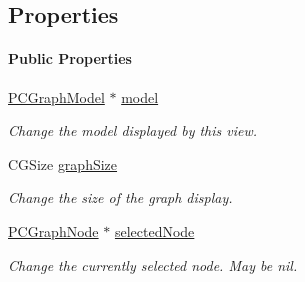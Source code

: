 \subsection*{Properties}
\begin{Indent}\paragraph*{Public Properties}
\begin{DoxyCompactItemize}
\item 
\hypertarget{interface_p_c_graph_view_ac07154e9fd0c99a34419cd5d462c1370}{
\hyperlink{interface_p_c_graph_model}{PCGraphModel} $\ast$ \hyperlink{interface_p_c_graph_view_ac07154e9fd0c99a34419cd5d462c1370}{model}}
\label{interface_p_c_graph_view_ac07154e9fd0c99a34419cd5d462c1370}

\begin{DoxyCompactList}\small\item\em Change the model displayed by this view. \end{DoxyCompactList}\item 
\hypertarget{interface_p_c_graph_view_a90df2651ac9edb7c291abfbebb2d14d5}{
CGSize \hyperlink{interface_p_c_graph_view_a90df2651ac9edb7c291abfbebb2d14d5}{graphSize}}
\label{interface_p_c_graph_view_a90df2651ac9edb7c291abfbebb2d14d5}

\begin{DoxyCompactList}\small\item\em Change the size of the graph display. \end{DoxyCompactList}\item 
\hypertarget{interface_p_c_graph_view_a98a8317522d01143c612fa47243ef6b4}{
\hyperlink{interface_p_c_graph_node}{PCGraphNode} $\ast$ \hyperlink{interface_p_c_graph_view_a98a8317522d01143c612fa47243ef6b4}{selectedNode}}
\label{interface_p_c_graph_view_a98a8317522d01143c612fa47243ef6b4}

\begin{DoxyCompactList}\small\item\em Change the currently selected node. May be nil. \end{DoxyCompactList}\end{DoxyCompactItemize}
\end{Indent}
